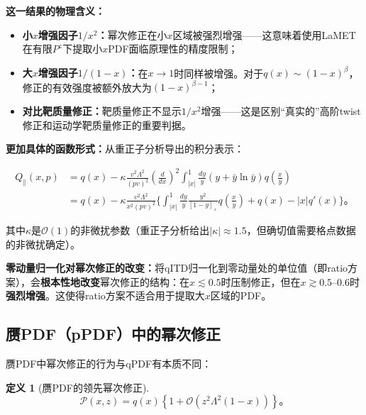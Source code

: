 \documentclass[12pt,a4paper]{ctexart}
\theoremstyle{definition}
\newtheorem{definition}{定义}[section]
\begin{document}
\textbf{这一结果的物理含义：}

\begin{itemize}
    \item \textbf{小$x$增强因子$1/x^2$：}幂次修正在小$x$区域被强烈增强——这意味着使用LaMET在有限$P^z$下提取小$x$PDF面临原理性的精度限制；
    \item \textbf{大$x$增强因子$1/(1-x)$：}在$x \to 1$时同样被增强。对于$q(x) \sim (1-x)^\beta$，修正的有效强度被额外放大为$(1-x)^{\beta-1}$；
    \item \textbf{对比靶质量修正：}靶质量修正不显示$1/x^2$增强——这是区别``真实的''高阶twist修正和运动学靶质量修正的重要判据。
\end{itemize}

\textbf{更加具体的函数形式：}从重正子分析导出的积分表示\cite{Braun2019power}：

\begin{equation}
\begin{aligned}
Q_\parallel(x, p) &= q(x) - \kappa \frac{v^2\Lambda^2}{(pv)^2} \left(\frac{d}{dx}\right)^2 \int_{|x|}^1 \frac{dy}{y} (y + \bar{y}\ln\bar{y}) q\left(\frac{x}{y}\right) \\
&= q(x) - \kappa \frac{v^2\Lambda^2}{x^2(pv)^2} \Bigg\{ \int_{|x|}^1 \frac{dy}{y} \frac{y^2}{[1-y]_+} q\left(\frac{x}{y}\right) + q(x) - |x|q'(x) \Bigg\}。
\end{aligned}
\label{eq:qPDF_power_correction_integral}
\end{equation}

其中$\kappa$是$\mathcal{O}(1)$的非微扰参数（重正子分析给出$|\kappa| \approx 1.5$，但确切值需要格点数据的非微扰确定）。

\textbf{零动量归一化对幂次修正的改变：}将qITD归一化到零动量处的单位值（即ratio方案），会\textbf{根本性地改变}幂次修正的结构\cite{Braun2019power}：在$x \lesssim 0.5$时压制修正，但在$x \gtrsim 0.5$--$0.6$时\textbf{强烈增强}。这使得ratio方案不适合用于提取大$x$区域的PDF。

\subsection{赝PDF（pPDF）中的幂次修正}

赝PDF中幂次修正的行为与qPDF有本质不同\cite{Braun2019power}：

\begin{definition}[赝PDF的领先幂次修正]
\begin{equation}
\boxed{\mathcal{P}(x, z) = q(x) \left\{1 + \mathcal{O}\left(z^2\Lambda^2(1-x)\right)\right\}}。
\label{eq:power_correction_pPDF}
\end{equation}
\end{definition}
\end{document}
